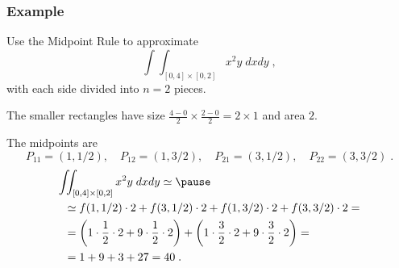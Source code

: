 \begin{frame}
  \frametitle{Example}

  Use the Midpoint Rule to approximate
%
$$\int\!\!\!\int_{[0,4]\times [0,2]} x^2y\; dxdy\; ,$$
%
with each side divided into $n=2$ pieces.

\pause
The smaller rectangles have size $\frac{4-0}{2} \times \frac{2-0}{2} = 2\times 1$ and area $2$.

\pause
The midpoints are
%
$$P_{11} = (1,1/2), \quad P_{12} = (1,3/2), \quad P_{21} = (3,1/2),  \quad P_{22} = (3,3/2)\; .$$
%
\pause
\begin{align*}
  \int\!\!\!&\int_{[0,4]\times [0,2]} x^2y\; dxdy  \simeq \pause \\
  & \simeq f(1,1/2) \cdot 2 +  f(3,1/2) \cdot 2 + f(1,3/2) \cdot 2  + f(3,3/2) \cdot 2 = \\
  & = \left(1\cdot \frac{1}{2}\cdot 2 + 9 \cdot \frac{1}{2} \cdot 2\right) + \left(1\cdot \frac{3}{2} \cdot 2 + 9 \cdot \frac{3}{2} \cdot 2\right) = \\
  &= 1+9+3+27 = 40\; .
\end{align*}
\end{frame}
